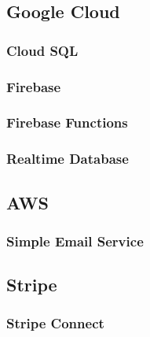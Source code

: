 \subsection{Google Cloud}
\subsubsection{Cloud SQL}
\subsubsection{Firebase}
\subsubsection{Firebase Functions}
\subsubsection{Realtime Database}
\subsection{AWS}
\subsubsection{Simple Email Service}
\subsection{Stripe}
\subsubsection{Stripe Connect}